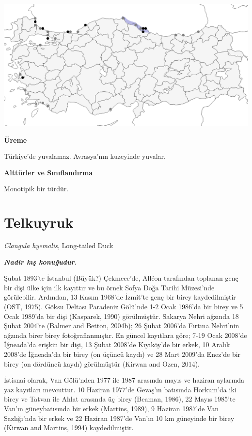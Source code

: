 \documentclass[
  a4paper,
  DIV=11,
  numbers=noendperiod]{scrartcl}
\begin{document}
\includegraphics{images/harita_Melanitta nigra.png}

\textbf{Üreme}

Türkiye'de yuvalamaz. Avrasya'nın kuzeyinde yuvalar.

\textbf{Alttürler ve Sınıflandırma}

Monotipik bir türdür.

\section{Telkuyruk}\label{telkuyruk}

\emph{Clangula hyemalis}, Long-tailed Duck

\textbf{\emph{Nadir kış konuğudur.}}

Şubat 1893'te İstanbul (Büyük?) Çekmece'de, Alléon tarafından toplanan
genç bir dişi ülke için ilk kayıttır ve bu örnek Sofya Doğa Tarihi
Müzesi'nde görülebilir. Ardından, 13 Kasım 1968'de İzmit'te genç bir
birey kaydedilmiştir (OST, 1975). Göksu Deltası Paradeniz Gölü'nde 1-2
Ocak 1986'da bir birey ve 5 Ocak 1989'da bir dişi (Kasparek, 1990)
görülmüştür. Sakarya Nehri ağzında 18 Şubat 2004'te (Balmer and Betton,
2004b); 26 Şubat 2006'da Fırtına Nehri'nin ağzında birer birey
fotoğraflanmıştır. En güncel kayıtlara göre; 7-19 Ocak 2008'de
İğneada'da erişkin bir dişi, 13 Şubat 2008'de Kıyıköy'de bir erkek, 10
Aralık 2008'de İğneada'da bir birey (on üçüncü kaydı) ve 28 Mart 2009'da
Enez'de bir birey (on dördüncü kaydı) görülmüştür (Kirwan and Özen,
2014).

İstisnai olarak, Van Gölü'nden 1977 ile 1987 arasında mayıs ve haziran
aylarında yaz kayıtları mevcuttur. 10 Haziran 1977'de Gevaş'ın batısında
Horkum'da iki birey ve Tatvan ile Ahlat arasında üç birey (Beaman,
1986), 22 Mayıs 1985'te Van'ın güneybatısında bir erkek (Martins, 1989),
9 Haziran 1987'de Van Sazlığı'nda bir erkek ve 22 Haziran 1987'de Van'ın
10 km güneyinde bir birey (Kirwan and Martins, 1994) kaydedilmiştir.
\end{document}
